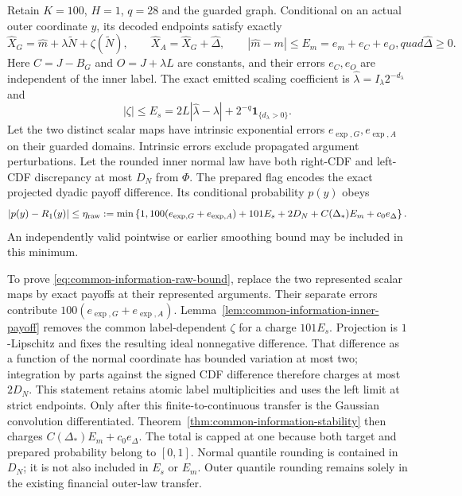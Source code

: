 Retain $K=100$, $H=1$, $q=28$ and the guarded graph. Conditional on an
actual outer coordinate $y$, its decoded endpoints satisfy exactly
\begin{equation}
 \widehat X_G=\widehat m+\lambda\widetilde N+\zeta(\widetilde N),\qquad
 \widehat X_A=\widehat X_G+\widehat\Delta,\qquad
 |\widehat m-m|\leq E_m=e_m+e_C+e_O,quad
 \widehat\Delta\geq0.
 \label{eq:common-information-raw-endpoints}
\end{equation}
Here $C=J-B_G$ and $O=J+\lambda L$ are constants, and their errors
$e_C,e_O$ are independent of the inner label. The exact emitted scaling
coefficient is $\widehat\lambda=I_\lambda2^{-d_\lambda}$ and
\begin{equation}
 |\zeta|\leq E_s=2L|\widehat\lambda-\lambda|
                    +2^{-q}\mathbf1_{\{d_\lambda>0\}}.
 \label{eq:common-information-scale-error}
\end{equation}
Let the two distinct scalar maps have intrinsic exponential errors
$e_{\exp,G},e_{\exp,A}$ on their guarded domains. Intrinsic errors exclude
propagated argument perturbations. Let the rounded inner normal law have
both right-CDF and left-CDF discrepancy at most $D_N$ from $\Phi$.
The prepared flag encodes the exact projected dyadic payoff difference.
Its conditional probability $p(y)$ obeys
\begin{equation}
 |p(y)-R_1(y)|\leq\eta_{\rm raw}:=
 \min\left\{1,100(e_{\exp,G}+e_{\exp,A})+101E_s+2D_N
                       +C(\Delta_*)E_m+c_0e_\Delta\right\}.
 \label{eq:common-information-raw-bound}
\end{equation}
An independently valid pointwise or earlier smoothing bound may be
included in this minimum.

To prove \eqref{eq:common-information-raw-bound}, replace the two
represented scalar maps by exact payoffs at their represented arguments.
Their separate errors contribute $100(e_{\exp,G}+e_{\exp,A})$.
Lemma~\ref{lem:common-information-inner-payoff} removes the common
label-dependent $\zeta$ for a charge $101E_s$. Projection is
$1$-Lipschitz and fixes the resulting ideal nonnegative difference.
That difference as a function of the normal coordinate has bounded
variation at most two; integration by parts against the signed CDF
difference therefore charges at most $2D_N$. This statement retains
atomic label multiplicities and uses the left limit at strict endpoints.
Only after this finite-to-continuous transfer is the Gaussian
convolution differentiated. Theorem~\ref{thm:common-information-stability}
then charges $C(\Delta_*)E_m+c_0e_\Delta$. The total is capped at one
because both target and prepared probability belong to $[0,1]$.
Normal quantile rounding is contained in $D_N$; it is not also included
in $E_s$ or $E_m$. Outer quantile rounding remains solely in the existing
financial outer-law transfer.

